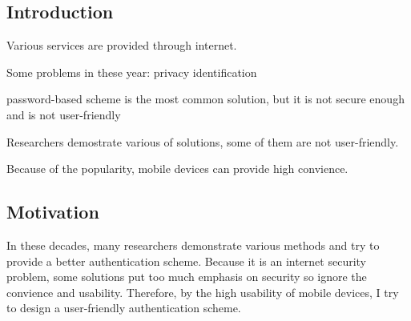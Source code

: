 %
%

\begin{CJK}{Bg5}{bsmi}
\chapter{Introduction}

Various services are provided through internet.

Some problems in these year:
	privacy
	identification

password-based scheme is the most common solution, but it is not secure enough and is not user-friendly



Researchers demostrate various of solutions, some of them are not user-friendly.

Because of the popularity, mobile devices can provide high convience.

\begin{comment}
In the age of information, more and more services are provided through the internet. Thought it brings us a convient daily life, there are some problems emerge. First, the convience of internet make the bondaries between people blur. Therefore, it is an important issue about how to protect our privacy.
The second problem is that
\end{comment}

\section{Motivation}

In these decades, many researchers demonstrate various methods and try to provide a better authentication scheme. Because it is an internet security problem, some solutions put too much emphasis on security so ignore the convience and usability. Therefore, by the high usability of mobile devices, I try to design a user-friendly authentication scheme.


\begin{comment}
As authentication system is an important part in the world of internet. A good authentication system may protect everyone's privacy not be invaded by the malicious person. 
So far, because of the easy design, the password-based scheme is the most common solution about authentication issue. However, there were some researches demontrates that this was not a proper solution in both security and usability. 
\end{comment}



\end{CJK}
